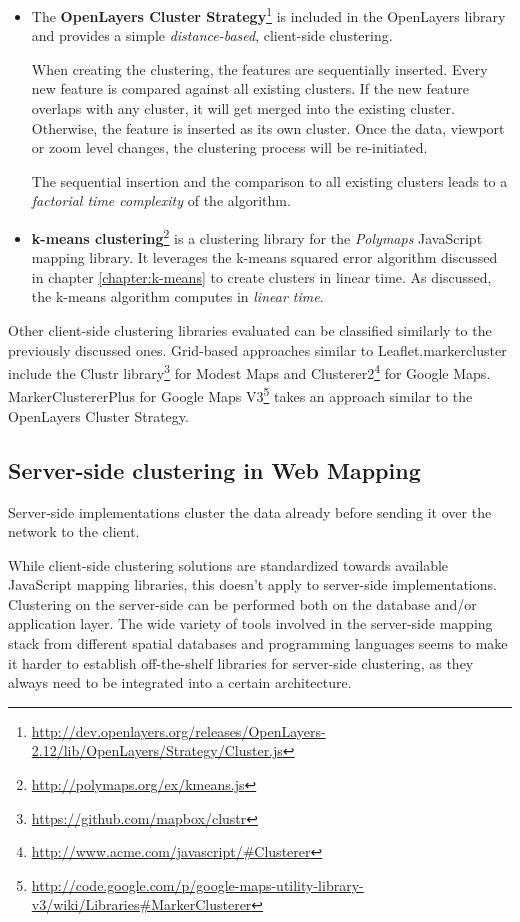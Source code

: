 \begin{itemize}
\item The \textbf{OpenLayers Cluster Strategy}\footnote{\url{http://dev.openlayers.org/releases/OpenLayers-2.12/lib/OpenLayers/Strategy/Cluster.js}} is included in the OpenLayers library and provides a simple \textit{distance-based}, client-side clustering.

When creating the clustering, the features are sequentially inserted. Every new feature is compared against all existing clusters. If the new feature overlaps with any cluster, it will get merged into the existing cluster. Otherwise, the feature is inserted as its own cluster. Once the data, viewport or zoom level changes, the clustering process will be re-initiated. 

The sequential insertion and the comparison to all existing clusters leads to a \textit{factorial time complexity} of the algorithm. 

\item \textbf{k-means clustering}\footnote{\url{http://polymaps.org/ex/kmeans.js}} is a clustering library for the \textit{Polymaps} JavaScript mapping library. It leverages the k-means squared error algorithm discussed in chapter \ref{chapter:k-means} to create clusters in linear time. As discussed, the k-means algorithm computes in \textit{linear time}.

\end{itemize}

Other client-side clustering libraries evaluated can be classified similarly to the previously discussed ones. Grid-based approaches similar to Leaflet.markercluster include the Clustr library\footnote{\url{https://github.com/mapbox/clustr}} for Modest Maps and Clusterer2\footnote{\url{http://www.acme.com/javascript/\#Clusterer}} for Google Maps. MarkerClustererPlus for Google Maps V3\footnote{\url{http://code.google.com/p/google-maps-utility-library-v3/wiki/Libraries\#MarkerClusterer}} takes an approach similar to the OpenLayers Cluster Strategy.

\subsection{Server-side clustering in Web Mapping}

Server-side implementations cluster the data already before sending it over the network to the client.

While client-side clustering solutions are standardized towards available JavaScript mapping libraries, this doesn't apply to server-side implementations. Clustering on the server-side can be performed both on the database and/or application layer. The wide variety of tools involved in the server-side mapping stack from different spatial databases and programming languages seems to make it harder to establish off-the-shelf libraries for server-side clustering, as they always need to be integrated into a certain architecture.

